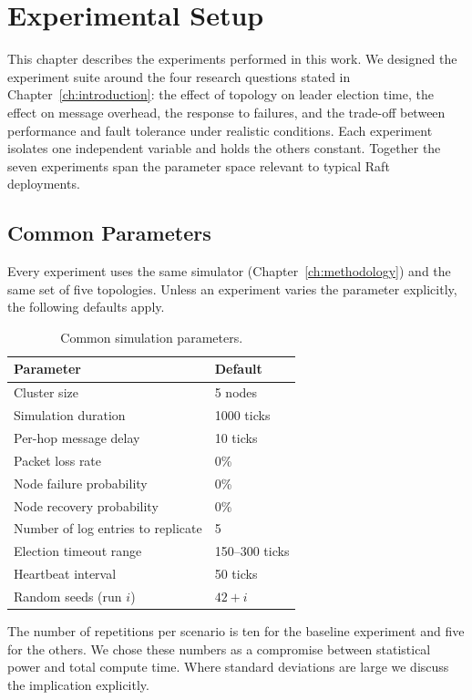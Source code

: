 \chapter{Experimental Setup}
\label{ch:experiments}

This chapter describes the experiments performed in this work. We designed the experiment suite around the four research questions stated in Chapter~\ref{ch:introduction}: the effect of topology on leader election time, the effect on message overhead, the response to failures, and the trade-off between performance and fault tolerance under realistic conditions. Each experiment isolates one independent variable and holds the others constant. Together the seven experiments span the parameter space relevant to typical Raft deployments.

\section{Common Parameters}

Every experiment uses the same simulator (Chapter~\ref{ch:methodology}) and the same set of five topologies. Unless an experiment varies the parameter explicitly, the following defaults apply.

\begin{table}[H]
\centering
\caption{Common simulation parameters.}
\label{tab:common_params}
\begin{tabular}{ll}
\toprule
\textbf{Parameter} & \textbf{Default} \\
\midrule
Cluster size               & 5 nodes \\
Simulation duration        & 1000 ticks \\
Per-hop message delay      & 10 ticks \\
Packet loss rate           & 0\% \\
Node failure probability   & 0\% \\
Node recovery probability  & 0\% \\
Number of log entries to replicate & 5 \\
Election timeout range     & 150--300 ticks \\
Heartbeat interval         & 50 ticks \\
Random seeds (run $i$)     & $42 + i$ \\
\bottomrule
\end{tabular}
\end{table}

The number of repetitions per scenario is ten for the baseline experiment and five for the others. We chose these numbers as a compromise between statistical power and total compute time. Where standard deviations are large we discuss the implication explicitly.

